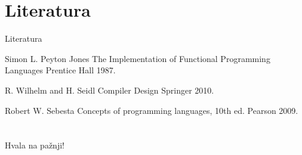 \documentclass[xcolor={dvipsnames}, 11pt]{beamer}
\begin{document}
\section{Literatura}
\begin{frame}{Literatura}
	
	\begin{thebibliography}{10}
		
		\beamertemplatearticlebibitems
		\bibitem{}
			Simon L. Peyton Jones
			\newblock The Implementation of Functional Programming Languages	
			\newblock Prentice Hall 1987.
		
		\beamertemplatearticlebibitems
		\bibitem{}
			R. Wilhelm and H. Seidl
			\newblock Compiler Design
			\newblock Springer 2010.
		
		\beamertemplatearticlebibitems
		\bibitem{}
			Robert W. Sebesta 
			\newblock Concepts of programming languages, 10th ed.
			\newblock Pearson 2009.
			
	\end{thebibliography}
\end{frame}

\section{}
\begin{frame}
	\centering \Large Hvala na pažnji!
\end{frame}
	
	
\end{document}
